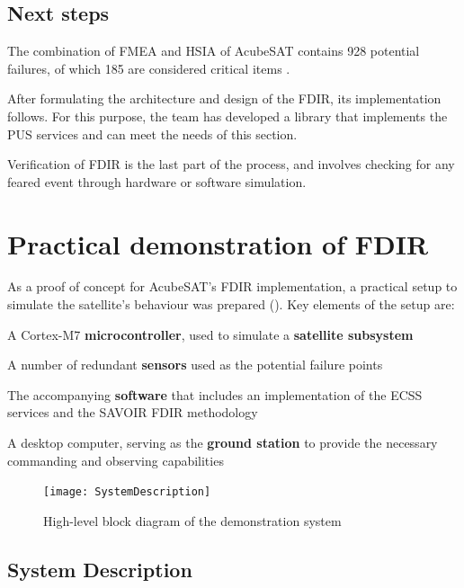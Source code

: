 \documentclass[a4paper,nobib]{tufte-book}
\begin{document}
\section{Next steps}
The combination of \acs{FMEA} and \acs{HSIA} of AcubeSAT contains 928 potential failures, of which 185 are considered critical items \autocite{retselis_acubesat_fmea_2020}.

After formulating the architecture and design of the \acs{FDIR}, its implementation follows. For this purpose, the team has developed a library that implements the \acs{PUS} services and can meet the needs of this section.

Verification of \acs{FDIR} is the last part of the process, and involves checking for any feared event through hardware or software simulation.

\chapter{Practical demonstration of \ac{FDIR}}

As a proof of concept for AcubeSAT's \ac{FDIR} implementation, a practical setup to simulate the satellite's behaviour was prepared (). Key elements of the setup are:
\begin{compactitem}
	\item A Cortex-M7 \textbf{microcontroller}, used to simulate a \textbf{satellite subsystem}
	\item A number of redundant \textbf{sensors} used as the potential failure points
	\item The accompanying \textbf{software} that includes an implementation of the \ac{ECSS} services and the \ac{SAVOIR} \ac{FDIR} methodology
	\item A desktop computer, serving as the \textbf{ground station} to provide the necessary commanding and observing capabilities
\end{compactitem}

\begin{figure}[h]
	\texttt{[image: SystemDescription]}
	\caption{High-level block diagram of the demonstration system}
	\label{fig:block}
\end{figure}

\section{System Description}
\end{document}
